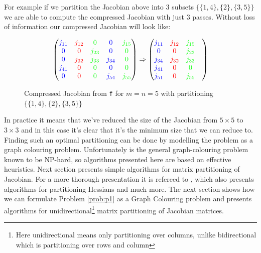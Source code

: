 For example if we partition the Jacobian above into 3 subsets $\{\{1,4\}, \{2\}, \{3,5\}\}$ we are able to compute the compressed Jacobian with just 3 passes. Without loss of information our compressed Jacobian will look like: 
\begin{figure}[H]
		$$ \left(\begin{matrix}
	{\color{blue} j_{11}} & {\color{red} j_{12}} & {\color{green} 0 }        &  {\color{blue} 0 }       & {\color{green} j_{15}} \\
	{\color{blue} 0}        & {\color{red} 0 }       & {\color{green} j_{23}}  &  {\color{blue} 0 }      & {\color{green} 0} \\
	{\color{blue} 0}        & {\color{red}j_{32}} &  {\color{green} j_{33}}  & {\color{blue} j_{34}} & {\color{green} 0 } \\
	{\color{blue} j_{41}} & {\color{red} 0 }       & {\color{green} 0 }         & {\color{blue} 0 }        & {\color{green} 0} \\
	{\color{blue} 0 }       & {\color{red} 0 }       & {\color{green} 0 }         & {\color{blue} j_{54}} & {\color{green} j_{55} }
	\end{matrix}\right) \Rightarrow \left(\begin{matrix}
	{\color{blue} j_{11}} & {\color{red} j_{12}} & {\color{green} j_{15}} \\
	{\color{blue} 0} & {\color{red} 0} & {\color{green} j_{23}} \\
	{\color{blue} j_{34}} & {\color{red} j_{32}} & {\color{green} j_{33}}  \\
	{\color{blue} j_{41}} & {\color{red} 0} & {\color{green} 0}  \\
	{\color{blue} j_{51}} & {\color{red} 0} & {\color{green} j_{55}} &  
	\end{matrix}\right) $$
	\caption{Compressed Jacobian from \texttt{f} for $m=n=5$ with partitioning $\{\{1,4\}, \{2\}, \{3,5\}\}$}
	\label{fig:Jacob_partition}
\end{figure}
In practice it means that we've reduced the size of the Jacobian from $5 \times 5$ to $3 \times 3$ and in this case it's clear that it's the minimum size that we can reduce to. Finding such an optimal partitioning can be done
by modelling the problem as a graph colouring problem.  Unfortunately is 
the general graph-colouring problem known to be NP-hard, so algorithms presented here are based on effective heuristics. Next section presents simple algorithms for matrix partitioning of Jacobian. For a more thorough presentation it is refereed to \cite{Jacobian}, which also presents algorithms for 
partitioning Hessians and much more. The next section shows how we can formulate Problem \ref{prob:p1} as a 
Graph Colouring problem and presents algorithms for unidirectional\footnote{Here unidirectional means only partitioning over columns, unlike bidirectional which is partitioning over rows and column} matrix partitioning of Jacobian matrices. 


